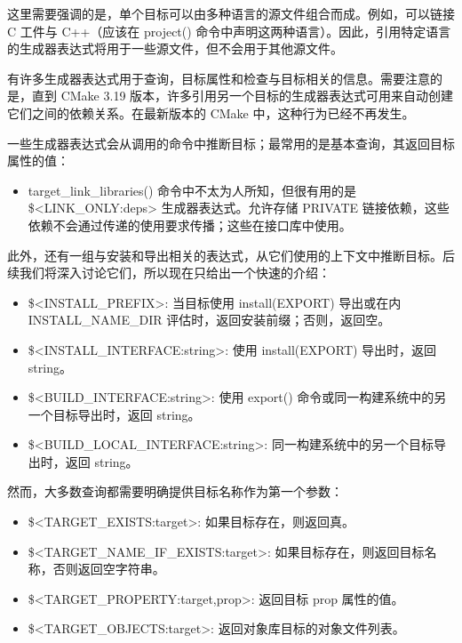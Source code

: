 这里需要强调的是，单个目标可以由多种语言的源文件组合而成。例如，可以链接 C 工件与 C++（应该在 project() 命令中声明这两种语言）。因此，引用特定语言的生成器表达式将用于一些源文件，但不会用于其他源文件。


有许多生成器表达式用于查询，目标属性和检查与目标相关的信息。需要注意的是，直到 CMake 3.19 版本，许多引用另一个目标的生成器表达式可用来自动创建它们之间的依赖关系。在最新版本的 CMake 中，这种行为已经不再发生。

一些生成器表达式会从调用的命令中推断目标；最常用的是基本查询，其返回目标属性的值：


\begin{itemize}
\item
target\_link\_libraries() 命令中不太为人所知，但很有用的是 \$<LINK\_ONLY:deps> 生成器表达式。允许存储 PRIVATE 链接依赖，这些依赖不会通过传递的使用要求传播；这些在接口库中使用。
\end{itemize}

此外，还有一组与安装和导出相关的表达式，从它们使用的上下文中推断目标。后续我们将深入讨论它们，所以现在只给出一个快速的介绍：

\begin{itemize}
\item
\$<INSTALL\_PREFIX>: 当目标使用 install(EXPORT) 导出或在内 INSTALL\_NAME\_DIR 评估时，返回安装前缀；否则，返回空。

\item
\$<INSTALL\_INTERFACE:string>: 使用 install(EXPORT) 导出时，返回 string。

\item
\$<BUILD\_INTERFACE:string>: 使用 export() 命令或同一构建系统中的另一个目标导出时，返回 string。

\item
\$<BUILD\_LOCAL\_INTERFACE:string>: 同一构建系统中的另一个目标导出时，返回 string。
\end{itemize}

然而，大多数查询都需要明确提供目标名称作为第一个参数：

\begin{itemize}
\item
\$<TARGET\_EXISTS:target>: 如果目标存在，则返回真。

\item
\$<TARGET\_NAME\_IF\_EXISTS:target>: 如果目标存在，则返回目标名称，否则返回空字符串。

\item
\$<TARGET\_PROPERTY:target,prop>: 返回目标 prop 属性的值。

\item
\$<TARGET\_OBJECTS:target>: 返回对象库目标的对象文件列表。
\end{itemize}

